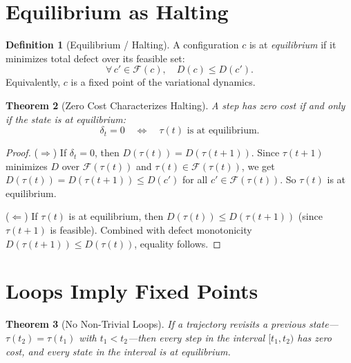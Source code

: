 \documentclass[11pt,a4paper]{article}
\theoremstyle{plain}
\newtheorem{theorem}{Theorem}[section]
\theoremstyle{definition}
\newtheorem{definition}[theorem]{Definition}
\theoremstyle{remark}
\begin{document}
\section{Equilibrium as Halting}\label{sec:equilibrium}

\begin{definition}[Equilibrium / Halting]\label{def:equilibrium}
A configuration $c$ is at \emph{equilibrium} if it minimizes total defect over its feasible set:
\[
\forall\, c' \in \mathcal{F}(c),\quad D(c) \le D(c').
\]
Equivalently, $c$ is a fixed point of the variational dynamics.
\end{definition}

\begin{theorem}[Zero Cost Characterizes Halting]\label{thm:halting-equiv}
A step has zero cost if and only if the state is at equilibrium:
\[
\delta_t = 0 \quad\Longleftrightarrow\quad \tau(t) \text{ is at equilibrium.}
\]
\end{theorem}

\begin{proof}
($\Rightarrow$)
If $\delta_t = 0$, then $D(\tau(t)) = D(\tau(t{+}1))$.
Since $\tau(t{+}1)$ minimizes $D$ over $\mathcal{F}(\tau(t))$ and $\tau(t) \in \mathcal{F}(\tau(t))$, we get $D(\tau(t)) = D(\tau(t{+}1)) \le D(c')$ for all $c' \in \mathcal{F}(\tau(t))$.
So $\tau(t)$ is at equilibrium.

\noindent($\Leftarrow$)
If $\tau(t)$ is at equilibrium, then $D(\tau(t)) \le D(\tau(t{+}1))$ (since $\tau(t{+}1)$ is feasible).
Combined with defect monotonicity $D(\tau(t{+}1)) \le D(\tau(t))$, equality follows.
\end{proof}

\section{Loops Imply Fixed Points}\label{sec:loops}

\begin{theorem}[No Non-Trivial Loops]\label{thm:noloops}
If a trajectory revisits a previous state---$\tau(t_2) = \tau(t_1)$ with $t_1 < t_2$---then every step in the interval $[t_1, t_2)$ has zero cost, and every state in the interval is at equilibrium.
\end{theorem}
\end{document}
